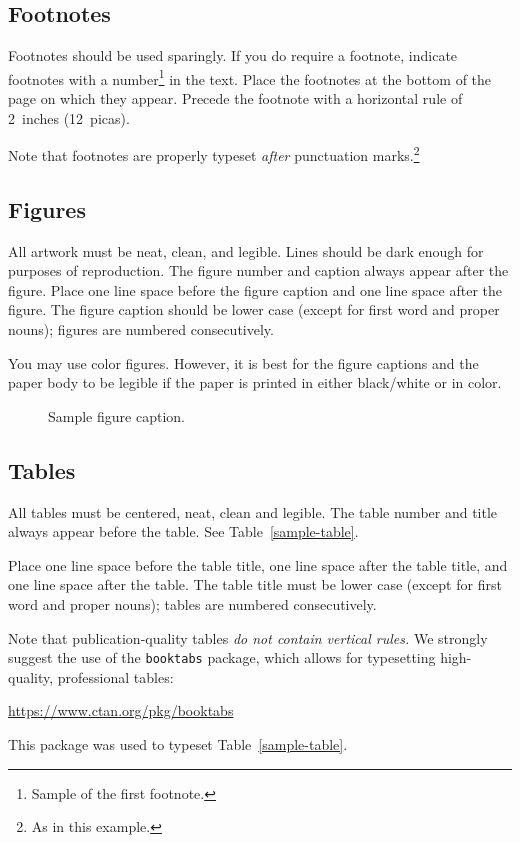\documentclass{article}
\begin{document}
\subsection{Footnotes}

Footnotes should be used sparingly.  If you do require a footnote,
indicate footnotes with a number\footnote{Sample of the first
  footnote.} in the text. Place the footnotes at the bottom of the
page on which they appear.  Precede the footnote with a horizontal
rule of 2~inches (12~picas).

Note that footnotes are properly typeset \emph{after} punctuation
marks.\footnote{As in this example.}

\subsection{Figures}

All artwork must be neat, clean, and legible. Lines should be dark
enough for purposes of reproduction. The figure number and caption
always appear after the figure. Place one line space before the figure
caption and one line space after the figure. The figure caption should
be lower case (except for first word and proper nouns); figures are
numbered consecutively.

You may use color figures.  However, it is best for the figure
captions and the paper body to be legible if the paper is printed in
either black/white or in color.
\begin{figure}[h]
  \centering
  \fbox{\rule[-.5cm]{0cm}{4cm} \rule[-.5cm]{4cm}{0cm}}
  \caption{Sample figure caption.}
\end{figure}

\subsection{Tables}

All tables must be centered, neat, clean and legible.  The table
number and title always appear before the table.  See
Table~\ref{sample-table}.

Place one line space before the table title, one line space after the
table title, and one line space after the table. The table title must
be lower case (except for first word and proper nouns); tables are
numbered consecutively.

Note that publication-quality tables \emph{do not contain vertical
  rules.} We strongly suggest the use of the \verb+booktabs+ package,
which allows for typesetting high-quality, professional tables:
\begin{center}
  \url{https://www.ctan.org/pkg/booktabs}
\end{center}
This package was used to typeset Table~\ref{sample-table}.
\end{document}
